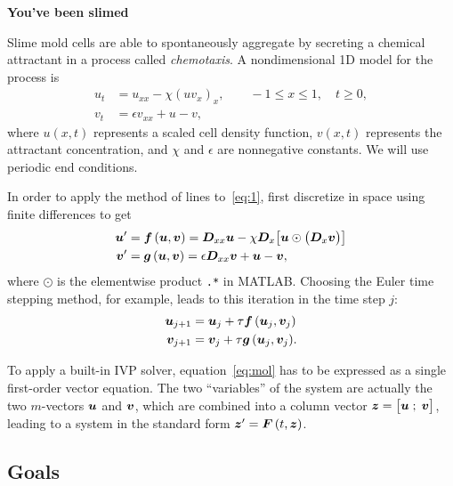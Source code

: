\documentclass[11pt,twoside]{article}
\begin{document}
   
\begin{center}
    \bf You've been slimed
\end{center}

Slime mold cells are able to spontaneously aggregate by secreting a chemical attractant in a process called \emph{chemotaxis}. A nondimensional 1D model for the process is
\begin{equation}
\label{eq:1}
    \begin{split}
    u_t &= u_{xx} - \chi (uv_x)_x, \qquad -1\le x \le 1, \quad t\ge0, \\
    v_t &= \epsilon v_{xx} + u - v,
    \end{split}
\end{equation}
where $u(x,t)$ represents a scaled cell density function, $v(x,t)$
represents the attractant concentration, and $\chi$ and $\epsilon$ are nonnegative constants. We will use periodic end conditions. 

In order to apply the method of lines to~\eqref{eq:1}, first discretize in space using finite differences to get
\begin{equation}
\label{eq:mol}
    \begin{split}
    \bm{u}' &= \bm{f}\,(\bm{u},\bm{v}) = \bm{D}_{xx} \bm{u} - \chi \bm{D}_x \bigl[\bm{u} \odot \bigl(\bm{D}_{x} \bm{v} \bigr)\bigr] 
    \\
    \bm{v}' &= \bm{g}\,(\bm{u},\bm{v}) = \epsilon \bm{D}_{xx} \bm{v} + \bm{u} - \bm{v},
    \end{split}
\end{equation}
where $\odot$ is the elementwise product \verb|.*| in MATLAB. Choosing the Euler time stepping method, for example, leads to this iteration in the time step $j$:
\begin{equation}
\label{eq:euler}
\begin{split}
\bm{u}_{j+1} &= \bm{u}_j + \tau \bm{f}\,(\bm{u}_j,\bm{v}_j) \\
\bm{v}_{j+1} &= \bm{v}_j + \tau \bm{g}\,(\bm{u}_j,\bm{v}_j).
\end{split}
\end{equation}

To apply a built-in IVP solver, equation~\eqref{eq:mol} has to be expressed as a single first-order vector equation. The two ``variables'' of the system are actually the two $m$-vectors $\bm{u}$ and $\bm{v}$, which are combined into a column vector $\bm{z}=\bigl[ \bm{u}\;;\; \bm{v} \bigr]$, leading to a system in the standard form $\bm{z}'=\bm{F}\,(t,\bm{z})$. 

\subsection*{Goals}
\end{document}
